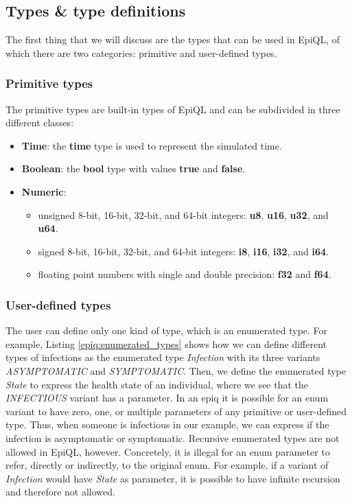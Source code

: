 \subsection{Types \& type definitions}
\label{subsec:types_and_type_definitions}
The first thing that we will discuss are the types that can be used in EpiQL, of which there are two categories: primitive and user-defined types.

\subsubsection{Primitive types}
The primitive types are built-in types of EpiQL and can be subdivided in three different classes:
\begin{itemize}
    \item \textbf{Time}: the \textbf{time} type is used to represent the simulated time.
    \item \textbf{Boolean}: the \textbf{bool} type with values \textbf{true} and \textbf{false}.
    \item \textbf{Numeric}:
    \begin{itemize}
        \item unsigned 8-bit, 16-bit, 32-bit, and 64-bit integers: \textbf{u8}, \textbf{u16}, \textbf{u32}, and \textbf{u64}.
        \item signed 8-bit, 16-bit, 32-bit, and 64-bit integers: \textbf{i8}, \textbf{i16}, \textbf{i32}, and \textbf{i64}.
        \item floating point numbers with single and double precision: \textbf{f32} and \textbf{f64}.
    \end{itemize}
\end{itemize}

\subsubsection{User-defined types}
The user can define only one kind of type, which is an enumerated type. For example, Listing \ref{epiq:enumerated_types} shows how we can define different types of infections as the enumerated type \textit{Infection} with its three variants \textit{ASYMPTOMATIC} and \textit{SYMPTOMATIC}. Then, we define the enumerated type \textit{State} to express the health state of an individual, where we see that the \textit{INFECTIOUS} variant has a parameter. In an epiq it is possible for an enum variant to have zero, one, or multiple parameters of any primitive or user-defined type. Thus, when someone is infectious in our example, we can express if the infection is asymptomatic or symptomatic. Recursive enumerated types are not allowed in EpiQL, however. Concretely, it is illegal for an enum parameter to refer, directly or indirectly, to the original enum. For example, if a variant of \textit{Infection} would have \textit{State} as parameter, it is possible to have infinite recursion and therefore not allowed.

